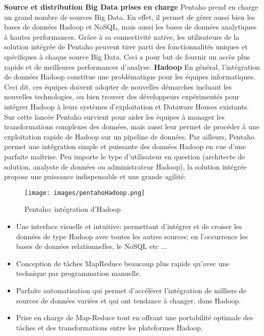 \documentclass[12pt,a4wide,twoside]{report}
\begin{document}
\textbf{Source et distribution Big Data prises en charge \newline}
Pentaho prend en charge un grand nombre de sources Big Data. En effet, il permet de gérer aussi bien les bases de données Hadoop et NoSQL, mais aussi les bases de données analytiques à hautes performances.\newline
Grâce à sa connectivité native, les utilisateurs de la solution intégrée de Pentaho peuvent tirer parti des fonctionnalités uniques et spécifiques à chaque source Big Data. Ceci a pour but de fournir un accès plus rapide et de meilleures performances d'analyse.\newline
\textbf{Hadoop \newline}
En général, l'intégration de données Hadoop constitue une problématique pour les équipes informatiques. Ceci dit, ces équipes doivent adopter de nouvelles démarches incluant les nouvelles technologies, ou bien trouver des développeurs expérimentés pour intégrer Hadoop à leurs systèmes d'exploitation et Dataware Houses existants.\newline
Sur cette lancée Pentaho survient pour aider les équipes à manager les transformations complexes des données, mais aussi leur permet de procéder à une exploitation rapide de Hadoop sur un pipeline de données. \newline 
Par ailleurs, Pentaho permet une intégration simple et puissante des données Hadoop en vue d'une parfaite maîtrise. Peu importe le type d'utilisateur en question (architecte de solution, analyste de données ou administrateur Hadoop), la solution intégrée propose une puissance indispensable et une grande agilité:
\begin{figure}[!h]
	\begin{center}
		\texttt{[image: images/pentahoHadoop.png]}
\end{center}
\caption{Pentaho: intégration d'Hadoop}
\end{figure}
\begin{itemize}
	\item Une interface visuelle et intuitive: permettant d'intégrer et de croiser les données de type Hadoop avec toutes les autres sources; en l'occurrence les bases de données relationnelles, le NoSQL etc ...
	\item Conception de tâches MapReduce beaucoup plus rapide qu'avec une technique par programmation manuelle.
	\item Parfaite automatisation qui permet d'accélérer l'intégration de milliers de sources de données variées et qui ont tendance à changer, dans Hadoop.
	\item Prise en charge de Map-Reduce tout en offrant une portabilité optimale des tâches et des transformations entre les plateformes Hadoop.
\end{itemize}
 
\end{document}
